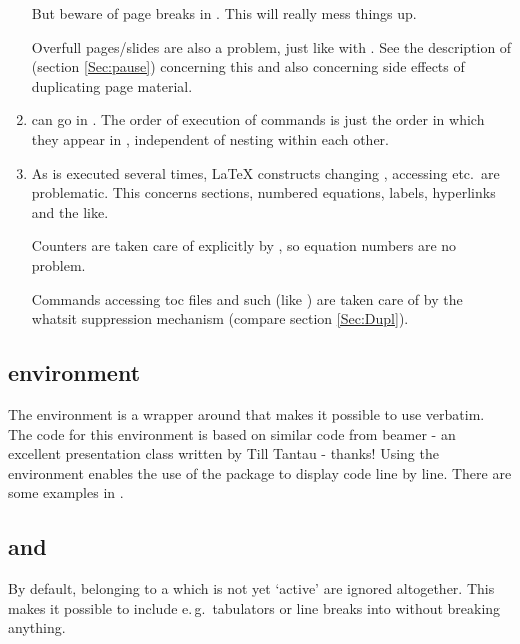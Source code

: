 \begin{slide}
\begin{enumerate}
    But beware of page breaks in . This will really mess things up.

    Overfull pages/slides are also a problem, just like with . See the description of 
    (section \ref{Sec:pause}) concerning this and also concerning side effects of duplicating page material.

  \item {} can go in . The order of execution of  commands is just the
    order in which they appear in , independent of nesting within each other.

    \newslide

  \item As  is executed several times, \LaTeX{} constructs changing , accessing
     etc.\ are problematic. This concerns sections, numbered equations, labels, hyperlinks and the like.

    Counters are taken care of explicitly by , so equation numbers are no problem.

    Commands accessing toc files and such (like ) are taken care of by the whatsit suppression
    mechanism (compare section \ref{Sec:Dupl}).
  \end{enumerate}

  \newslide

  \subsection{ environment}\label{Sec:fragilesteps}%

  The  environment is a wrapper around 
  that makes it possible to use verbatim. The code for this environment is based on similar code from beamer - an
  excellent presentation class written by Till Tantau - thanks! Using the  environment
  enables the use of the  package to display code line by line. There are some examples in
  .

  \newslide

  \subsection{ and }\label{Sec:boxedsteps}%
  By default,  belonging to a  which is not yet `active' are ignored altogether. This
  makes it possible to include e.\,g.\ tabulators \code{\&} or line breaks into  without breaking
  anything.


\end{slide}
